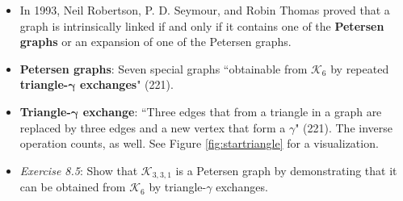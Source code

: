 \documentclass[titlepage]{article}
\numberwithin{figure}{section}
\numberwithin{table}{section}
\numberwithin{equation}{section}
\newcommand{\dq}[2]{``#1" (#2).}
\begin{document}
\begin{itemize}
    \item In 1993, Neil Robertson, P. D. Seymour, and Robin Thomas proved that a graph is intrinsically linked if and only if it contains one of the \textbf{Petersen graphs} or an expansion of one of the Petersen graphs.
    \item \textbf{Petersen graphs}: Seven special graphs \dq{obtainable from $\mathcal{K}_6$ by repeated \textbf{triangle-$\mathbf{\gamma}$ exchanges}}{221}
    \item \textbf{Triangle-$\mathbf{\gamma}$ exchange}: \dq{Three edges that from a triangle in a graph are replaced by three edges and a new vertex that form a $\gamma$}{221} The inverse operation counts, as well. See Figure \ref{fig:startriangle} for a visualization.
    \item \emph{Exercise 8.5}: Show that $\mathcal{K}_{3,3,1}$ is a Petersen graph by demonstrating that it can be obtained from $\mathcal{K}_6$ by triangle-$\gamma$ exchanges.
\end{itemize}
\end{document}
